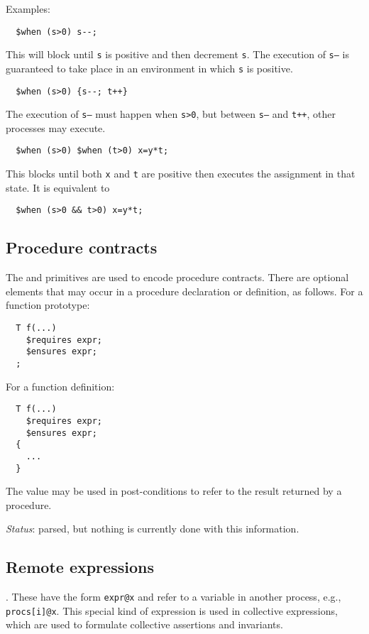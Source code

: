 Examples:
\begin{verbatim}
  $when (s>0) s--;
\end{verbatim}
This will block until \texttt{s} is positive and then decrement
\texttt{s}.  The execution of \texttt{s--} is guaranteed to take place
in an environment in which \texttt{s} is positive.

\begin{verbatim}
  $when (s>0) {s--; t++}
\end{verbatim}
The execution of \texttt{s--} must happen when \texttt{s>0}, but
between \texttt{s--} and \texttt{t++}, other processes may execute.

\begin{verbatim}
  $when (s>0) $when (t>0) x=y*t;
\end{verbatim}
This blocks until both \texttt{x} and \texttt{t} are positive then
executes the assignment in that state.  It is equivalent to
\begin{verbatim}
  $when (s>0 && t>0) x=y*t;
\end{verbatim}

\subsection{Procedure contracts}
The \crequires{} and \censures{} primitives are used to encode
procedure contracts.  There are optional
elements that may occur in a procedure declaration or definition,
as follows.  For a function prototype:
\begin{verbatim}
  T f(...)
    $requires expr;
    $ensures expr;
  ;
\end{verbatim}
For a function definition:
\begin{verbatim}
  T f(...)
    $requires expr;
    $ensures expr;
  {
    ...
  }
\end{verbatim}
The value \cresult{} may be used in post-conditions to refer
to the result returned by a procedure.

\emph{Status}: parsed, but nothing is currently done with this
information.

\subsection{Remote expressions}.  These have the form \verb!expr@x!
and refer to a variable in another process, e.g., \verb!procs[i]@x!.
This special kind of expression is used in collective expressions,
which are used to formulate collective assertions and invariants.

